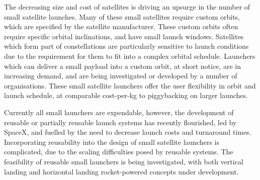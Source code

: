 \documentclass[journal]{new-aiaa} %
\begin{document}
The decreasing size and cost of satellites is driving an upsurge in the number of small satellite launches\cite{Faa&Ast&Comstac2015}\cite{Maddock2016}. Many of these small satellites require custom orbits, which are specified by the satellite manufacturer. These custom orbits often require specific orbital inclinations, and have small launch windows. Satellites which form part of constellations are particularly sensitive to launch conditions due to the requirement for them to fit into a complex orbital schedule\cite{Crisp2015}. Launchers which can deliver a small payload into a custom orbit, at short notice, are in increasing demand, and are being investigated or developed by a number of organisations\cite{Linkspace,DARPA2017,Lynx,Maddock2017,Kuhn2017,charania,Gilmour,Bloostar,Virgin,Firefly, Electron}. These small satellite launchers offer the user flexibility in orbit and launch schedule, at comparable cost-per-kg to piggybacking on larger launches. 

Currently all small launchers are expendable, however, the development of reusable or partially reusable launch systems has recently flourished, led by SpaceX, and fuelled by the need to decrease launch costs and turnaround times. Incorporating reusability into the design of small satellite launchers is complicated, due to the scaling difficulties posed by reusable systems. The feasibility of reusable small launchers is being investigated, with  both vertical landing \cite{Linkspace} and horizontal landing \cite{DARPA2017,Lynx} rocket-powered concepts under development. 
\end{document}
